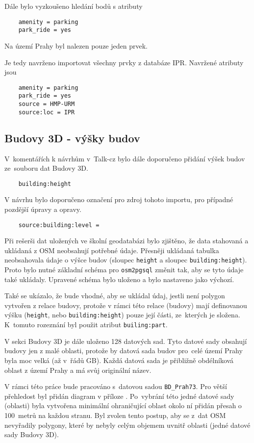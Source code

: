 Dále bylo vyzkoušeno hledání bodů s atributy
\begin{verbatim}
    amenity = parking
    park_ride = yes
\end{verbatim}
Na území Prahy byl nalezen pouze jeden prvek.

Je tedy navrženo importovat všechny prvky z databáze IPR.
Navržené atributy jsou
\begin{verbatim}
    amenity = parking
    park_ride = yes
    source = HMP-URM
    source:loc = IPR
\end{verbatim}


\subsection{Budovy 3D - výšky budov}
\label{Budovy 3D - výšky budov}
V~komentářích k návrhům v~Talk-cz bylo dále doporučeno přidání
výšek budov ze~souboru dat Budovy 3D.
\begin{verbatim}
    building:height
\end{verbatim}
V návrhu bylo doporučeno označení pro zdroj tohoto importu, pro případné pozdější úpravy a opravy.
\begin{verbatim}
    source:building:level =
\end{verbatim}

Při rešerši dat uložených ve školní geodatabázi bylo zjištěno,
že data stahovaná a ukládaná z OSM neobsahují potřebné údaje.
Přesněji ukládaná tabulka neobsahovala údaje o výšce budov
(sloupec {\tt height} a sloupec {\tt building\::height}).
Proto bylo nutné základní schéma pro {\tt osm2pgsql} změnit tak, aby se tyto údaje také 
ukládaly. Upravené schéma bylo uloženo a bylo nastaveno jako výchozí.

Také se ukázalo, že bude vhodné, aby se ukládal údaj, jestli
není polygon vytvořen z relace budovy, protože v rámci této relace
(budovy) mají definovanou výšku ({\tt height}, nebo
{\tt building\::height}) pouze její části, ze~kterých je složena.
K~tomuto rozeznání byl použit atribut {\tt builing\::part}.

V sekci Budovy 3D je dále uloženo 128 datových sad. Tyto datové sady obsahují budovy jen z malé oblasti, protože
by datová sada budov pro~celé území Prahy byla moc velká (až v~řádů
GB). Každá datová sada je přibližně obdélníková oblast z území Prahy a
má svůj originální název.

V rámci této práce bude pracováno s~datovou sadou {\tt BD\_Prah73}.
Pro větší přehledost byl přidán diagram v příloze .
Po~vybrání této jedné datové sady (oblasti) byla
vytvořena minimální ohraničující oblast okolo ní přidán přesah o
100~metrů na každou stranu. Byl zvolen tento postup, aby se z~dat
OSM nevyřadily polygony, které by nebyly celým objemem uvnitř oblasti (jedné datové sady Budovy 3D).

